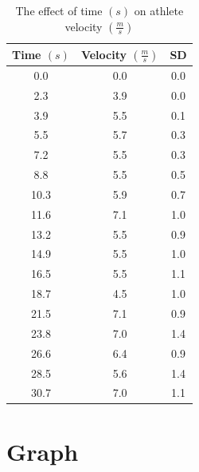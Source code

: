 \documentclass[index]{subfiles}
\begin{document}
\begin{table}[H]
    \centering
    \caption{The effect of time \((s)\) on athlete velocity \((\frac{m}{s})\)}
    \begin{tabular}{@{}ccc@{}} \toprule
        {Time \((s)\)} & {Velocity \((\frac{m}{s})\)} & {SD} \\ \midrule
        0.0            & 0.0                          & 0.0  \\
        2.3            & 3.9                          & 0.0  \\
        3.9            & 5.5                          & 0.1  \\
        5.5            & 5.7                          & 0.3  \\
        7.2            & 5.5                          & 0.3  \\
        8.8            & 5.5                          & 0.5  \\
        10.3           & 5.9                          & 0.7  \\
        11.6           & 7.1                          & 1.0  \\
        13.2           & 5.5                          & 0.9  \\
        14.9           & 5.5                          & 1.0  \\
        16.5           & 5.5                          & 1.1  \\
        18.7           & 4.5                          & 1.0  \\
        21.5           & 7.1                          & 0.9  \\
        23.8           & 7.0                          & 1.4  \\
        26.6           & 6.4                          & 0.9  \\
        28.5           & 5.6                          & 1.4  \\
        30.7           & 7.0                          & 1.1
    \end{tabular}
\end{table}


\section{Graph}
\end{document}
